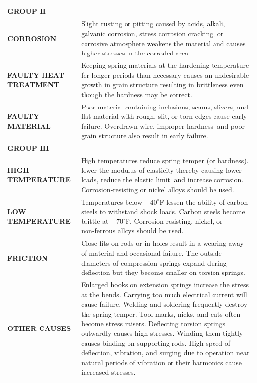 \documentclass[10pt]{article}
\begin{document}
\begin{table}[h!]
\begin{tabularx}{\textwidth}{|p{3cm}|p{12cm}|}
\multicolumn{2}{|l|}{\textbf{GROUP II}} \\
\hline
\textbf{CORROSION} &
Slight rusting or pitting caused by acids, alkali, galvanic corrosion, stress corrosion cracking, or corrosive atmosphere weakens the material and causes higher stresses in the corroded area. \\
\hline
\textbf{FAULTY HEAT TREATMENT} &
Keeping spring materials at the hardening temperature for longer periods than necessary causes an undesirable growth in grain structure resulting in brittleness even though the hardness may be correct. \\
\hline
\textbf{FAULTY MATERIAL} &
Poor material containing inclusions, seams, slivers, and flat material with rough, slit, or torn edges cause early failure. Overdrawn wire, improper hardness, and poor grain structure also result in early failure. \\
\hline

\multicolumn{2}{|l|}{\textbf{GROUP III}} \\
\hline
\textbf{HIGH TEMPERATURE} &
High temperatures reduce spring temper (or hardness), lower the modulus of elasticity thereby causing lower loads, reduce the elastic limit, and increase corrosion. Corrosion‑resisting or nickel alloys should be used. \\
\hline
\textbf{LOW TEMPERATURE} &
Temperatures below $-40^\circ$F lessen the ability of carbon steels to withstand shock loads. Carbon steels become brittle at $-70^\circ$F. Corrosion‑resisting, nickel, or non‑ferrous alloys should be used. \\
\hline
\textbf{FRICTION} &
Close fits on rods or in holes result in a wearing away of material and occasional failure. The outside diameters of compression springs expand during deflection but they become smaller on torsion springs. \\
\hline
\textbf{OTHER CAUSES} &
Enlarged hooks on extension springs increase the stress at the bends. Carrying too much electrical current will cause failure. Welding and soldering frequently destroy the spring temper. Tool marks, nicks, and cuts often become stress raisers. Deflecting torsion springs outwardly causes high stresses. Winding them tightly causes binding on supporting rods. High speed of deflection, vibration, and surging due to operation near natural periods of vibration or their harmonics cause increased stresses. \\
\hline

\end{tabularx}
\end{table}
\end{document}
